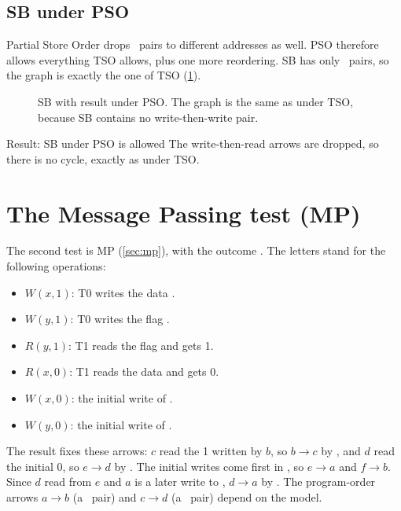 \subsection{SB under PSO}
\label{sec:pso}

Partial Store Order drops \WW\ pairs to different addresses as well. PSO therefore allows everything TSO allows, plus one more reordering. SB has only \WR\ pairs, so the graph is exactly the one of TSO (\cref{fig:sbpso}).

\begin{figure}[H]
\centering
{}
\caption{SB with result  under PSO. The graph is the same as under TSO, because SB contains no write-then-write pair.}
\label{fig:sbpso}
\end{figure}

\begin{resultbox}{Result: SB  under PSO is allowed}
The write-then-read arrows are dropped, so there is no cycle, exactly as under TSO.
\end{resultbox}

\section{The Message Passing test (MP)}
\label{sec:mpgraph}

The second test is MP (\cref{sec:mp}), with the outcome . The letters stand for the following operations:
\begin{itemize}
\item[\textbf{a}] $W(x,1)$: T0 writes the data .
\item[\textbf{b}] $W(y,1)$: T0 writes the flag .
\item[\textbf{c}] $R(y,1)$: T1 reads the flag and gets 1.
\item[\textbf{d}] $R(x,0)$: T1 reads the data and gets 0.
\item[\textbf{e}] $W(x,0)$: the initial write of .
\item[\textbf{f}] $W(y,0)$: the initial write of .
\end{itemize}
The result fixes these arrows: $c$ read the 1 written by $b$, so $b \to c$ by \rf, and $d$ read the initial 0, so $e \to d$ by \rf. The initial writes come first in \co, so $e \to a$ and $f \to b$. Since $d$ read from $e$ and $a$ is a later write to , $d \to a$ by \fr. The program-order arrows $a \to b$ (a \WW\ pair) and $c \to d$ (a \RR\ pair) depend on the model.

